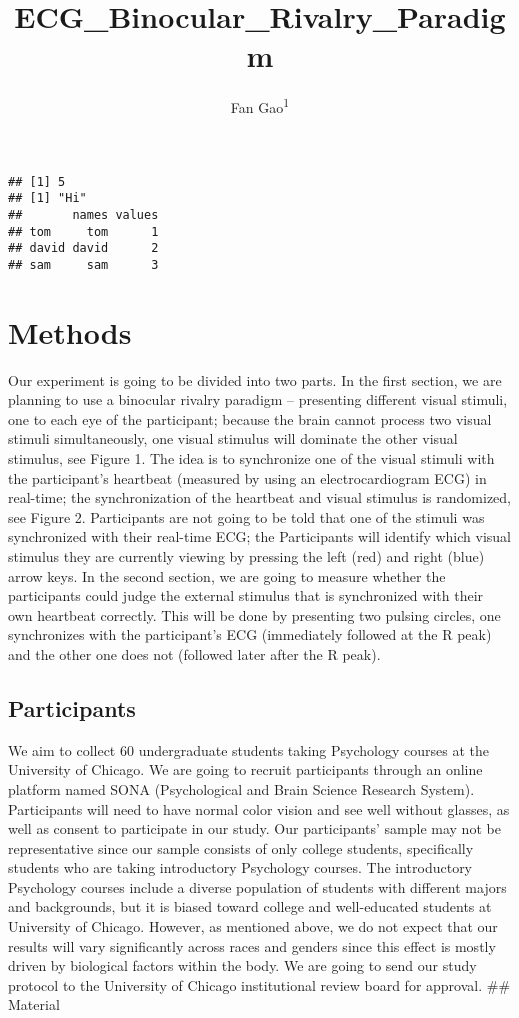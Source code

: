 \documentclass[
  man]{apa6}
\title{ECG\_Binocular\_Rivalry\_Paradigm}
\author{Fan Gao\textsuperscript{1}}
\date{}
\affiliation{\vspace{0.5cm}\textsuperscript{1} University of Chicago}
\begin{document}
\maketitle

\begin{verbatim}
## [1] 5
## [1] "Hi"
##       names values
## tom     tom      1
## david david      2
## sam     sam      3
\end{verbatim}

\hypertarget{methods}{%
\section{Methods}\label{methods}}

Our experiment is going to be divided into two parts. In the first section, we are planning to use a binocular rivalry paradigm -- presenting different visual stimuli, one to each eye of the participant; because the brain cannot process two visual stimuli simultaneously, one visual stimulus will dominate the other visual stimulus, see Figure 1. The idea is to synchronize one of the visual stimuli with the participant's heartbeat (measured by using an electrocardiogram ECG) in real-time; the synchronization of the heartbeat and visual stimulus is randomized, see Figure 2. Participants are not going to be told that one of the stimuli was synchronized with their real-time ECG; the Participants will identify which visual stimulus they are currently viewing by pressing the left (red) and right (blue) arrow keys. In the second section, we are going to measure whether the participants could judge the external stimulus that is synchronized with their own heartbeat correctly. This will be done by presenting two pulsing circles, one synchronizes with the participant's ECG (immediately followed at the R peak) and the other one does not (followed later after the R peak).

\hypertarget{participants}{%
\subsection{Participants}\label{participants}}

We aim to collect 60 undergraduate students taking Psychology courses at the University of Chicago. We are going to recruit participants through an online platform named SONA (Psychological and Brain Science Research System). Participants will need to have normal color vision and see well without glasses, as well as consent to participate in our study. Our participants' sample may not be representative since our sample consists of only college students, specifically students who are taking introductory Psychology courses. The introductory Psychology courses include a diverse population of students with different majors and backgrounds, but it is biased toward college and well-educated students at University of Chicago. However, as mentioned above, we do not expect that our results will vary significantly across races and genders since this effect is mostly driven by biological factors within the body. We are going to send our study protocol to the University of Chicago institutional review board for approval.
\#\# Material
\end{document}

